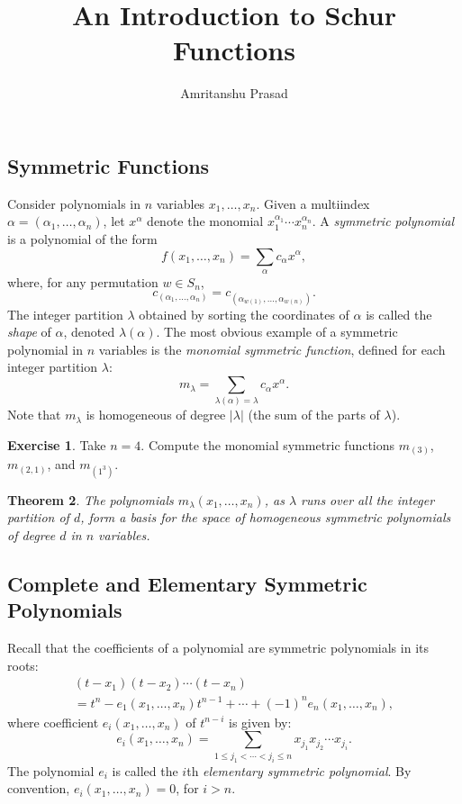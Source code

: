 \documentclass[11pt]{amsart}
\title{An Introduction to Schur Functions}
\author{Amritanshu Prasad}
\newtheorem{theorem}{Theorem}[subsection]
\theoremstyle{definition}
\theoremstyle{example}
\newtheorem{exercise}[theorem]{Exercise}
\begin{document}
\maketitle
\subsection{Symmetric Functions}
\label{sec:symmetric-functions}
Consider polynomials in $n$ variables $x_1,\dotsc,x_n$.
Given a multiindex $\alpha=(\alpha_1,\dotsc, \alpha_n)$, let $x^\alpha$ denote the monomial $x_1^{\alpha_1}\dotsb x_n^{\alpha_n}$.
A \emph{symmetric polynomial} is a polynomial of the form
\begin{displaymath}
  f(x_1,\dotsc, x_n) = \sum_{\alpha} c_\alpha x^\alpha,
\end{displaymath}
where, for any permutation $w\in S_n$,
\begin{displaymath}
  c_{(\alpha_1,\dotsc,\alpha_n)} = c_{(\alpha_{w(1)},\dotsc,\alpha_{w(n)})}.
\end{displaymath}
The integer partition $\lambda$ obtained by sorting the coordinates of $\alpha$  is called the \emph{shape} of $\alpha$, denoted $\lambda(\alpha)$.
The most obvious example of a symmetric polynomial in $n$ variables is the \emph{monomial symmetric function}, defined for each integer partition $\lambda$:
\begin{displaymath}
  m_\lambda = \sum_{\lambda(\alpha) = \lambda} c_\alpha x^\alpha.
\end{displaymath}
Note that $m_\lambda$ is homogeneous of degree $|\lambda|$ (the sum of the parts of $\lambda$).
\begin{exercise}
  Take $n=4$. Compute the monomial symmetric functions $m_{(3)}$, $m_{(2,1)}$, and $m_{(1^3)}$.
\end{exercise}
\begin{theorem}
The polynomials $m_\lambda(x_1,\dotsc,x_n)$, as $\lambda$ runs over all the integer partition of $d$, form a basis for the space of homogeneous symmetric polynomials of degree $d$ in $n$ variables.
\end{theorem}
\subsection{Complete and Elementary Symmetric Polynomials}
\label{sec:compl-elem-symm}
Recall that the coefficients of a polynomial are symmetric polynomials in its roots:
\begin{multline}
  \label{eq:elem-id}
  (t-x_1)(t-x_2)\dotsb (t-x_n) \\= t^n - e_1(x_1,\dotsc, x_n)t^{n-1} + \dotsb + (-1)^n e_n(x_1,\dotsc, x_n),
\end{multline}
where coefficient $e_i(x_1,\dotsc, x_n)$ of $t^{n-i}$ is given by:
\begin{equation}
  \label{eq:elem}
  e_i(x_1,\dotsc, x_n) = \sum_{1\leq j_1<\dotsb<j_i\leq n} x_{j_1}x_{j_2}\dotsb x_{j_i}.
\end{equation}
The polynomial $e_i$ is called the $i$th \emph{elementary symmetric polynomial}.
By convention, $e_i(x_1,\dotsc,x_n)=0$, for $i>n$.
\end{document}
